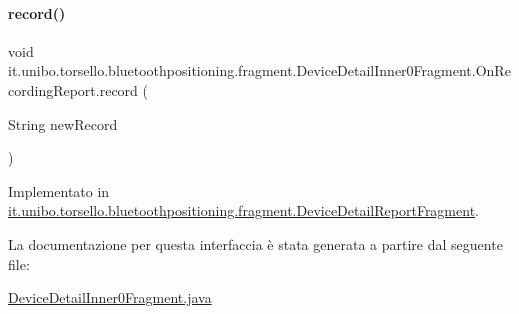 \paragraph{\texorpdfstring{record()}{record()}}
{\footnotesize\ttfamily void it.\+unibo.\+torsello.\+bluetoothpositioning.\+fragment.\+Device\+Detail\+Inner0\+Fragment.\+On\+Recording\+Report.\+record (\begin{DoxyParamCaption}\item[{String}]{new\+Record }\end{DoxyParamCaption})}



Implementato in \hyperlink{classit_1_1unibo_1_1torsello_1_1bluetoothpositioning_1_1fragment_1_1DeviceDetailReportFragment_ae9615d2a2096700befd416d0d8a95f85_ae9615d2a2096700befd416d0d8a95f85}{it.\+unibo.\+torsello.\+bluetoothpositioning.\+fragment.\+Device\+Detail\+Report\+Fragment}.



La documentazione per questa interfaccia è stata generata a partire dal seguente file\+:\begin{DoxyCompactItemize}
\item 
\hyperlink{DeviceDetailInner0Fragment_8java}{Device\+Detail\+Inner0\+Fragment.\+java}\end{DoxyCompactItemize}
